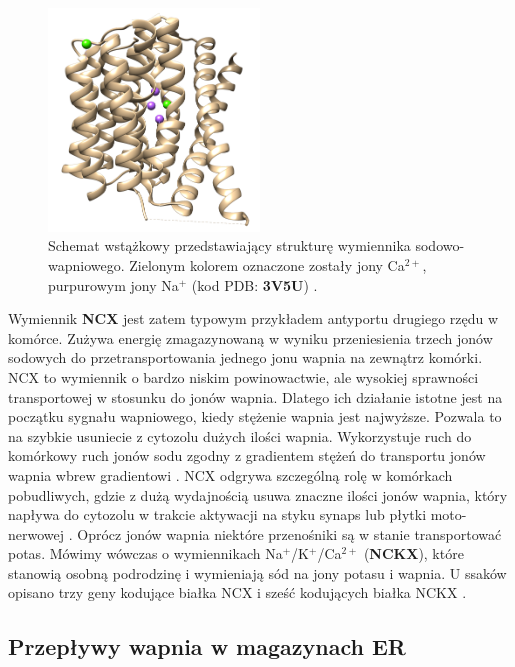 \begin{figure}
  \includegraphics[width=0.5\textwidth]{rysunki/rozdzial_1/ncx.png}
 \caption[Wymiennik NCX]{Schemat wstążkowy przedstawiający strukturę wymiennika sodowo-wapniowego. Zielonym kolorem oznaczone zostały jony Ca$^{2+}$, purpurowym jony Na$^+$ (kod PDB: \textbf{3V5U}) \cite{Liao2012}.}
 \label{fig:NCX}
\end{figure}

Wymiennik \textbf{NCX} jest zatem typowym przykładem antyportu drugiego rzędu w komórce. Zużywa energię zmagazynowaną w wyniku przeniesienia trzech jonów sodowych do przetransportowania jednego jonu wapnia na zewnątrz komórki.
NCX to wymiennik o bardzo niskim powinowactwie, ale wysokiej sprawności transportowej w stosunku do jonów wapnia. Dlatego ich działanie istotne jest na początku sygnału wapniowego, kiedy stężenie wapnia jest najwyższe. Pozwala to na szybkie usuniecie z cytozolu dużych ilości wapnia. Wykorzystuje ruch do komórkowy ruch jonów sodu zgodny z gradientem stężeń do transportu jonów wapnia wbrew gradientowi \cite{Shibukawa2007}. NCX odgrywa szczególną rolę w komórkach pobudliwych, gdzie z dużą wydajnością usuwa znaczne ilości jonów wapnia, który napływa do cytozolu w trakcie aktywacji na styku synaps lub płytki moto-nerwowej \cite{Annunziato2004}. Oprócz jonów wapnia niektóre przenośniki są w stanie transportować potas. Mówimy wówczas o wymiennikach Na$^+$/K$^+$/Ca$^{2+}$ (\textbf{NCKX}), które stanowią osobną podrodzinę i wymieniają sód na jony potasu i wapnia. U ssaków opisano trzy geny kodujące białka NCX i sześć kodujących białka NCKX \cite{Lytton2007}.


\FloatBarrier
\subsection{Przepływy wapnia w magazynach ER}\label{ss:transportER}

